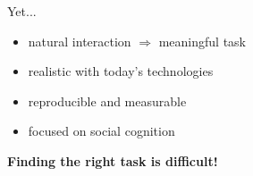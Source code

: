 \documentclass[compress]{beamer}
\begin{document}
\begin{frame}{Yet...}

    \begin{itemize}
        \item<+-> natural interaction $\Rightarrow$ meaningful task
        \item<+-> realistic with today's technologies
        \item<+-> reproducible and measurable
        \item<+-> focused on social cognition
    \end{itemize}

    \only<+-> {
    \begin{center}

    \Large

    \bf Finding the right task is difficult!

    \end{center}
}
\end{frame}
\end{document}
